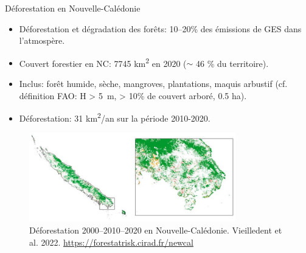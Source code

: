 \documentclass[10pt,table,dvipsnames,compress]{beamer}
\begin{document}
\begin{frame}[label={sec:org8de0168}]{Déforestation en Nouvelle-Calédonie}
\begin{itemize}
\item Déforestation et dégradation des forêts: 10--20\% des émissions de GES dans l'atmospère.
\item Couvert forestier en NC: 7745 km\textsuperscript{2} en 2020 (\(\sim\) 46 \% du territoire).
\item Inclus: forêt humide, sèche, mangroves, plantations, maquis arbustif (cf. définition FAO: H > 5 m, > 10\% de couvert arboré, 0.5 ha).
\item Déforestation: 31 km\textsuperscript{2}/an sur la période 2010-2020.
\end{itemize}

\begin{figure}[htbp]
\centering
\includegraphics[width=0.8\textwidth]{figs/deforestation-NC.jpg}
\caption{Déforestation 2000--2010--2020 en Nouvelle-Calédonie. Vieilledent et al. 2022. \url{https://forestatrisk.cirad.fr/newcal}}
\end{figure}
\end{frame}
\end{document}
